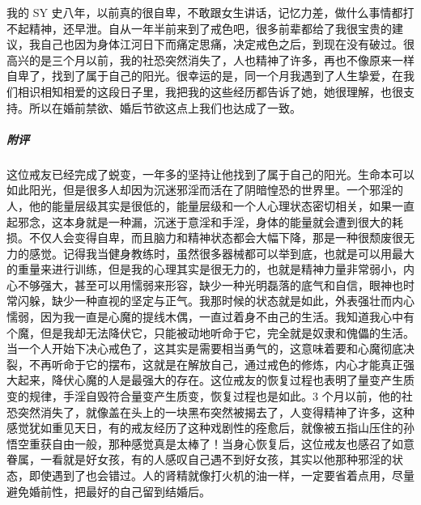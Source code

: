 \begin{case}
    我的 SY 史八年，以前真的很自卑，不敢跟女生讲话，记忆力差，做什么事情都打不起精神，还早泄。自从一年半前来到了戒色吧，很多前辈都给了我很宝贵的建议，我自己也因为身体江河日下而痛定思痛，决定戒色之后，到现在没有破过。很高兴的是三个月以前，我的社恐突然消失了，人也精神了许多，再也不像原来一样自卑了，找到了属于自己的阳光。很幸运的是，同一个月我遇到了人生挚爱，在我们相识相知相爱的这段日子里，我把我的这些经历都告诉了她，她很理解，也很支持。所以在婚前禁欲、婚后节欲这点上我们也达成了一致。
    \subparagraph{附评} 这位戒友已经完成了蜕变，一年多的坚持让他找到了属于自己的阳光。生命本可以如此阳光，但是很多人却因为沉迷邪淫而活在了阴暗惶恐的世界里。一个邪淫的人，他的能量层级其实是很低的，能量层级和一个人心理状态密切相关，如果一直起邪念，这本身就是一种漏，沉迷于意淫和手淫，身体的能量就会遭到很大的耗损。不仅人会变得自卑，而且脑力和精神状态都会大幅下降，那是一种很颓废很无力的感觉。记得我当健身教练时，虽然很多器械都可以举到底，也就是可以用最大的重量来进行训练，但是我的心理其实是很无力的，也就是精神力量非常弱小，内心不够强大，甚至可以用懦弱来形容，缺少一种光明磊落的底气和自信，眼神也时常闪躲，缺少一种直视的坚定与正气。我那时候的状态就是如此，外表强壮而内心懦弱，因为我一直是心魔的提线木偶，一直过着身不由己的生活。我知道我心中有个魔，但是我却无法降伏它，只能被动地听命于它，完全就是奴隶和傀儡的生活。当一个人开始下决心戒色了，这其实是需要相当勇气的，这意味着要和心魔彻底决裂，不再听命于它的摆布，这就是在解放自己，通过戒色的修炼，内心才能真正强大起来，降伏心魔的人是最强大的存在。这位戒友的恢复过程也表明了量变产生质变的规律，手淫自毁符合量变产生质变，恢复过程也是如此。3 个月以前，他的社恐突然消失了，就像盖在头上的一块黑布突然被揭去了，人变得精神了许多，这种感觉犹如重见天日，有的戒友经历了这种戏剧性的痊愈后，就像被五指山压住的孙悟空重获自由一般，那种感觉真是太棒了！当身心恢复后，这位戒友也感召了如意眷属，一看就是好女孩，有的人感叹自己遇不到好女孩，其实以他那种邪淫的状态，即使遇到了也会错过。人的肾精就像打火机的油一样，一定要省着点用，尽量避免婚前性，把最好的自己留到结婚后。
\end{case}

